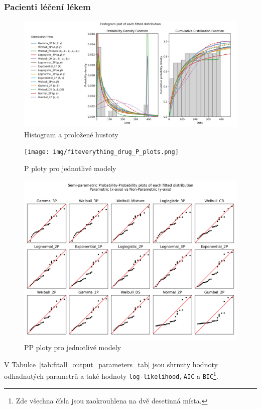 \documentclass[a4, 11pt]{article}
\theoremstyle{definition}
\theoremstyle{remark}
\begin{document}
	
	\subsubsection{Pacienti léčení lékem} \label{sec:parametric_drugs}
	
	\begin{figure}[H]
		\centering
		\includegraphics[width=0.9\linewidth]{img/fiteverything_drugs_histogram.png}
		\caption{Histogram a proložené hustoty}
		\label{fig:fit_everything_hist_drugs}
	\end{figure}

	\begin{figure}[H]
		\centering
		\texttt{[image: img/fiteverything\_drug\_P\_plots.png]}
		\caption{P ploty pro jednotlivé modely}
		\label{fig:fit_everything_drug_P_plots}
	\end{figure}
	
	\begin{figure}[H]
		\centering
		\includegraphics[width=0.8\linewidth]{img/fiteverything_drug_PP_plots.png}
		\caption{PP ploty pro jednotlivé modely}
		\label{fig:fit_everything_drug_PP_plots}
	\end{figure}
	
	V Tabulce~\ref{tab:fitall_output_parameters_tab} jsou shrnuty hodnoty odhadnutých parametrů a také hodnoty \texttt{log-likelihood}, \texttt{AIC} a \texttt{BIC}\footnote{Zde všechna čísla jsou zaokrouhlena na dvě desetinná místa.}.
	
\end{document}
